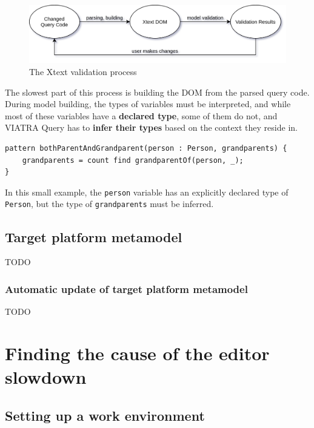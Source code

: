 \documentclass[11pt,a4paper,oneside]{report}
\begin{document}
\begin{figure}[ht]
\centering
\includegraphics[width=150mm, keepaspectratio]{figures/xtext-validation-process.png}
\caption{The Xtext validation process}
\label{fig:xtext-validation-process}
\end{figure}

The slowest part of this process is building the DOM from the parsed query code.
During model building, the types of variables must be interpreted, and while
most of these variables have a \textbf{declared type}, some of them do not, and
VIATRA Query has to \textbf{infer their types} based on the context they reside
in.

\begin{lstlisting}[frame=single]
pattern bothParentAndGrandparent(person : Person, grandparents) {
    grandparents = count find grandparentOf(person, _);
}
\end{lstlisting}

In this small example, the \texttt{person} variable has an explicitly declared
type of \texttt{Person}, but the type of \texttt{grandparents} must be inferred.

\section{Target platform metamodel}
TODO

\subsection{Automatic update of target platform metamodel}
TODO

\chapter{Finding the cause of the editor slowdown}

\section{Setting up a work environment}
\end{document}
